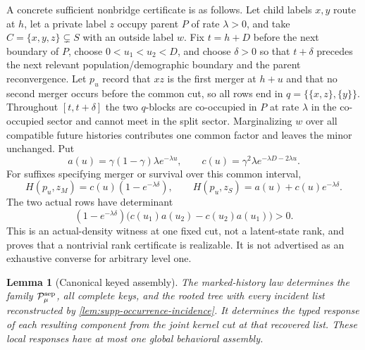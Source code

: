 \documentclass[11pt]{article}
\newtheorem{lemma}[theorem]{Lemma}
\newcommand{\cP}{\mathcal P}
\begin{document}
A concrete sufficient nonbridge certificate is as follows.  Let child labels $x,y$ route at $h$, let a private label $z$ occupy parent $P$ of rate $\lambda>0$, and take $C=\{x,y,z\}\subsetneq S$ with an outside label $w$.  Fix $t=h+D$ before the next boundary of $P$, choose $0<u_1<u_2<D$, and choose $\delta>0$ so that $t+\delta$ precedes the next relevant population/demographic boundary and the parent reconvergence.  Let $p_u$ record that $xz$ is the first merger at $h+u$ and that no second merger occurs before the common cut, so all rows end in $q=\{\{x,z\},\{y\}\}$.  Throughout $[t,t+\delta]$ the two $q$-blocks are co-occupied in $P$ at rate $\lambda$ in the co-occupied sector and cannot meet in the split sector.  Marginalizing $w$ over all compatible future histories contributes one common factor and leaves the minor unchanged.  Put
\[
a(u)=\gamma(1-\gamma)\lambda e^{-\lambda u},\qquad
c(u)=\gamma^2\lambda e^{-\lambda D-2\lambda u}.
\]
For suffixes specifying merger or survival over this common interval,
\[
H(p_u,z_M)=c(u)(1-e^{-\lambda\delta}),\qquad
H(p_u,z_S)=a(u)+c(u)e^{-\lambda\delta}.
\]
The two actual rows have determinant
\[
(1-e^{-\lambda\delta})\bigl(c(u_1)a(u_2)-c(u_2)a(u_1)\bigr)>0.
\]
This is an actual-density witness at one fixed cut, not a latent-state rank, and proves that a nontrivial rank certificate is realizable.  It is not advertised as an exhaustive converse for arbitrary level one.

\begin{lemma}[Canonical keyed assembly]
\label{lem:supp-keyed-assembly}
The marked-history law determines the family $\cP_\mu^{\rm sep}$, all complete keys, and the rooted tree with every incident list reconstructed by \cref{lem:supp-occurrence-incidence}.  It determines the typed response of each resulting component from the joint kernel cut at that recovered list.  These local responses have at most one global behavioral assembly.
\end{lemma}
\end{document}
